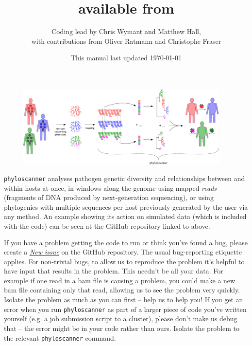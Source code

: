 \documentclass{article}
\title{\p\\available from \href{https://github.com/BDI-pathogens/phyloscanner}{\www{github.com/BDI-pathogens/phyloscanner}}}
\date{This manual last updated \today}
\author{Coding lead by Chris Wymant and Matthew Hall,\\with contributions from Oliver Ratmann and Christophe Fraser}
\newcommand{\p}{\texttt{phyloscanner}\xspace}
\newcommand{\www}{\color{blue} \underline}
\begin{document}
\maketitle


\begin{figure}[!h]
\centering
\includegraphics[width=0.95\textwidth]{PhyloscannerDiagram_big4.pdf}
\end{figure}

\vspace*{10mm}

\p analyses pathogen genetic diversity and relationships between and within hosts at once, in windows along the genome using mapped {\it reads} (fragments of DNA produced by next-generation sequencing), or using phylogenies with multiple sequences per host previously generated by the user via any method.
An example showing its action on simulated data (which is included with the code) can be seen at the GitHub repository linked to above.

\vspace*{10mm}

If you have a problem getting the code to run or think you've found a bug, please create a \href{https://github.com/BDI-pathogens/phyloscanner/issues}{\www{\it New issue}} on the GitHub repository.
The usual bug-reporting etiquette applies.
For non-trivial bugs, to allow us to reproduce the problem it's helpful to have input that results in the problem.
This needn't be all your data.
For example if one read in a bam file is causing a problem, you could make a new bam file containing only that read, allowing us to see the problem very quickly.
Isolate the problem as much as you can first -- help us to help you!
If you get an error when you run \p as part of a larger piece of code you've written yourself (e.g. a job submission script to a cluster), please don't make us debug that -- the error might be in your code rather than ours.
Isolate the problem to the relevant \p command.  

\newpage
\tableofcontents



\end{document}
